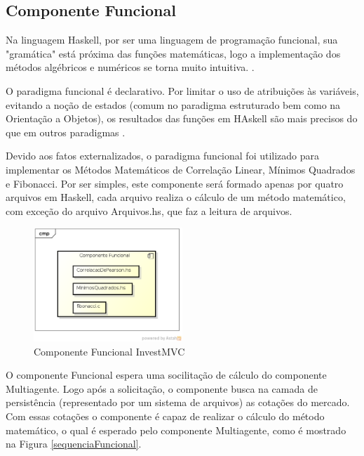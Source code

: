 \subsection{Componente Funcional}
Na linguagem Haskell, por ser uma linguagem de programação funcional, sua "gramática" está próxima das funções matemáticas, logo a implementação dos métodos algébricos e numéricos se torna muito intuitiva. \cite{hoogle2013}.

O paradigma funcional é declarativo. Por limitar o uso de atribuições às variáveis, evitando a noção de estados (comum no paradigma  estruturado bem como na Orientação a Objetos), os resultados das funções em HAskell são mais precisos do que em outros paradigmas \cite{piponi2006}.

Devido aos fatos externalizados, o paradigma funcional foi utilizado para implementar os Métodos Matemáticos de Correlação Linear, Mínimos Quadrados e Fibonacci. Por ser simples, este componente será formado apenas por quatro arquivos em Haskell, cada arquivo realiza o cálculo de um método matemático, com exceção do arquivo  Arquivos.hs, que faz a leitura de arquivos.

\begin{figure}[H]
\centering
\includegraphics[width=0.5\textwidth]{figuras/componenteFuncional}
\caption{Componente Funcional InvestMVC} 
\label{componenteFuncional}
\end{figure}

O componente Funcional espera uma socilitação de cálculo do componente Multiagente. Logo após a solicitação, o componente busca na camada de persistência (representado por um sistema de arquivos) as cotações do mercado. Com essas cotações o componente é capaz de realizar o cálculo do método matemático, o qual é esperado pelo componente Multiagente, como é mostrado na Figura \ref{sequenciaFuncional}.

